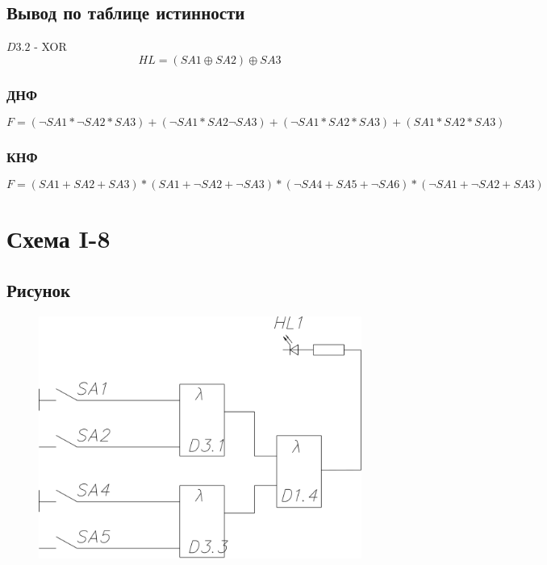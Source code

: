 \documentclass[a4paper]{article}
\begin{document}
\subsection{Вывод по таблице истинности}
$D3.2$ - XOR
$$ HL = (SA1 \oplus SA2) \oplus SA3 $$
\subsubsection{ДНФ}
$$ F = (\neg SA1*\neg SA2*SA3) + (\neg SA1*SA2 \neg SA3) + (\neg SA1*SA2*SA3) + ( SA1*SA2*SA3) $$
\subsubsection{КНФ}
$$ F = (SA1 + SA2 + SA3) * (SA1 + \neg SA2 + \neg SA3) * (\neg SA4 + SA5 + \neg SA6) * ( \neg SA1 + \neg SA2 + SA3 ) $$

\pagebreak


\section{Схема I-8}
\subsection{Рисунок}
\begin{figure}[H]
    \centering
    \includegraphics[width=300pt]{8.png}
\end{figure}
\end{document}
